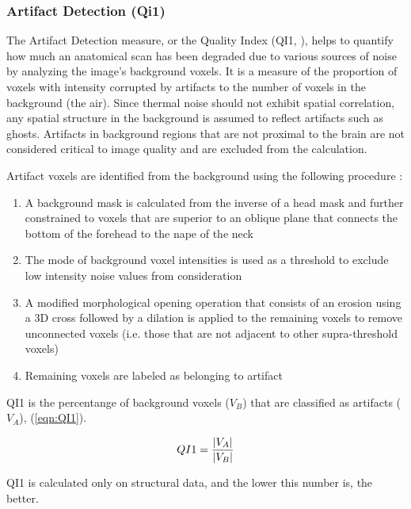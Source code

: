 \documentclass{frontiersSCNS} %
\begin{document}
\subsubsection*{Artifact Detection (Qi1)}
\label{sec:Qi1}
The Artifact Detection measure, or the Quality Index (QI1, \cite{mortamet2009}), helps to quantify how much an anatomical scan has been degraded due to various sources of noise by analyzing the image's background voxels. It is a measure of the proportion of voxels with intensity corrupted by artifacts to the number of voxels in the background (the air). Since thermal noise should not exhibit spatial correlation, any spatial structure in the background is assumed to reflect artifacts such as ghosts. Artifacts in background regions that are not proximal to the brain are not considered critical to image quality and are excluded from the calculation.

Artifact voxels are identified from the background using the following procedure \cite{mortamet2009}:

\begin{enumerate}
    \item A background mask is calculated from the inverse of a head mask and further constrained to voxels that are superior to an oblique plane that connects the bottom of the forehead to the nape of the neck
    \item The mode of background voxel intensities is used as a threshold to exclude low intensity noise values from consideration
    \item A modified morphological opening operation that consists of an erosion using a 3D cross followed by a dilation is applied to the remaining voxels to remove unconnected voxels (i.e. those that are not adjacent to other supra-threshold voxels)
    \item Remaining voxels are labeled as belonging to artifact
\end{enumerate}

QI1 is the percentange of background voxels ($V_B$) that are classified as artifacts ($V_A$), (\ref{eqn:QI1}). 

\begin{equation}
\label{eqn:QI1}
QI1 = \frac{|V_A|}{|V_B|} \\
\end{equation}

QI1 is calculated only on structural data, and the lower this number is, the better.
\end{document}
